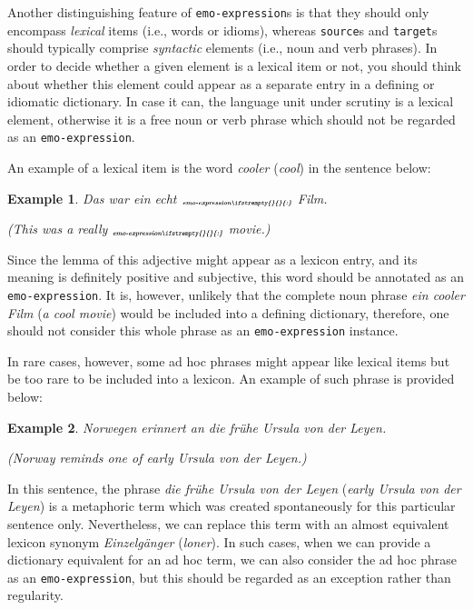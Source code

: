 \documentclass[11pt,a4paper]{article}
\theoremstyle{mytheoremstyle}
\newtheorem{exmp}{Example}[section]
\newcommand{\mtag}[2]{{\upshape[\emph{#2}\upshape]$_{\textrm{\bfseries\emph{\tiny
        #1}}}$}}
\newcommand{\emoexpression}[2][]{\mtag{emo-\-ex\-pression\ifstrempty{#1}{}{:#1}}{#2}}
\begin{document}
Another distinguishing feature of \texttt{emo-expression}s is that
they should only encompass \emph{lexical} items (i.e., words or
idioms), whereas \texttt{source}s and \texttt{target}s should
typically comprise \emph{syntactic} elements (i.e., noun and verb
phrases).  In order to decide whether a given element is a lexical
item or not, you should think about whether this element could appear
as a separate entry in a defining or idiomatic dictionary.  In case it
can, the language unit under scrutiny is a lexical element, otherwise
it is a free noun or verb phrase which should not be regarded as an
\texttt{emo-expression}.

An example of a lexical item is the word \emph{cooler} (\emph{cool})
in the sentence below:
\begin{exmp}
  Das war ein echt \emoexpression{cooler} Film.

  (This was a really \emoexpression{cool} movie.)
\end{exmp}
\noindent Since the lemma of this adjective might appear as a lexicon
entry, and its meaning is definitely positive and subjective, this
word should be annotated as an \texttt{emo-expression}.  It is,
however, unlikely that the complete noun phrase \emph{ein cooler Film}
(\emph{a cool movie}) would be included into a defining dictionary,
therefore, one should not consider this whole phrase as an
\texttt{emo-expression} instance.

In rare cases, however, some ad hoc phrases might appear like lexical
items but be too rare to be included into a lexicon.  An example of
such phrase is provided below:
\begin{exmp}
Norwegen erinnert an \textrm{die fr\"uhe Ursula von der Leyen}.

(Norway reminds one of \textrm{early Ursula von der Leyen}.)
\end{exmp}
\noindent In this sentence, the phrase \emph{die fr\"uhe Ursula von
  der Leyen} (\emph{early Ursula von der Leyen}) is a metaphoric term
which was created spontaneously for this particular sentence only.
Nevertheless, we can replace this term with an almost equivalent
lexicon synonym \emph{Einzelg\"anger} (\emph{loner}).  In such cases,
when we can provide a dictionary equivalent for an ad hoc term, we can
also consider the ad hoc phrase as an \texttt{emo-expression}, but
this should be regarded as an exception rather than regularity.
\end{document}
